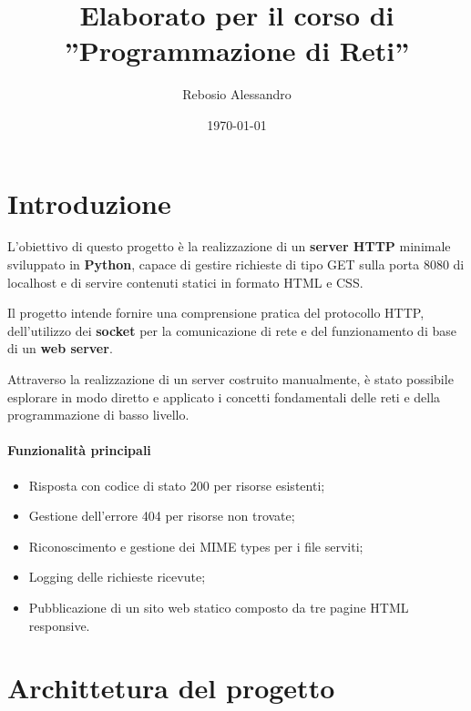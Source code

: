 \documentclass[a4paper,12pt]{report}
\title{Elaborato per il corso di\\''Programmazione di Reti''}
\author{Rebosio Alessandro}
\date{\today}
\begin{document}
\maketitle

\tableofcontents

\chapter{Introduzione}

L'obiettivo di questo progetto è la realizzazione di un \textbf{server HTTP} \newline minimale sviluppato in \textbf{Python},
capace di gestire richieste di tipo GET sulla porta 8080 di localhost e di servire contenuti statici
in formato HTML e CSS.

\vspace{0.5cm}

Il progetto intende fornire una comprensione pratica del protocollo HTTP, dell'utilizzo dei \textbf{socket}
per la comunicazione di rete e del funzionamento di base di un \textbf{web server}.

\vspace{0.5cm}

Attraverso la realizzazione di un server costruito manualmente, è stato possibile esplorare in modo diretto e
applicato i concetti fondamentali delle reti e della programmazione di basso livello.

\subsubsection{Funzionalità principali}
\begin{itemize}
    \item Risposta con codice di stato 200 per risorse esistenti;
    \item Gestione dell'errore 404 per risorse non trovate;
    \item Riconoscimento e gestione dei MIME types per i file serviti;
    \item Logging delle richieste ricevute;
    \item Pubblicazione di un sito web statico composto da tre pagine HTML responsive.
\end{itemize}

\chapter{Archittetura del progetto}
\end{document}
